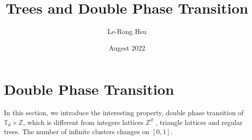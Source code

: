 \documentclass[12pt,a4paper]{article}
\title{Trees and Double Phase Transition}
\author{Le-Rong Hsu}
\date{Augest 2022}
\theoremstyle{plane}
\theoremstyle{definition}
\begin{document}
\section*{Double Phase Transition}

In this section, we introduce the interesting property, double phase transition of $\mathbb{T}_d\times\mathbb{Z}$, which is different from integers lattices $\mathbb{Z}^d$
, triangle lattices and regular trees. The number of infinite clusters changes on $[0,1]$.  
\end{document}

